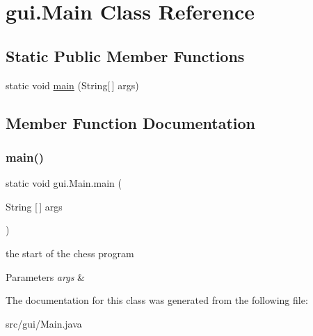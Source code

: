 \hypertarget{classgui_1_1_main}{}\section{gui.\+Main Class Reference}
\label{classgui_1_1_main}
\subsection*{Static Public Member Functions}
\begin{DoxyCompactItemize}
\item 
static void \mbox{\hyperlink{classgui_1_1_main_a041646fffc0529a864bae17dd55c8514}{main}} (String\mbox{[}$\,$\mbox{]} args)
\end{DoxyCompactItemize}


\subsection{Member Function Documentation}
\mbox{\label{classgui_1_1_main_a041646fffc0529a864bae17dd55c8514}} 
\subsubsection{\texorpdfstring{main()}{main()}}
{\footnotesize\ttfamily static void gui.\+Main.\+main (\begin{DoxyParamCaption}\item[{String \mbox{[}$\,$\mbox{]}}]{args }\end{DoxyParamCaption})\hspace{0.3cm}{\ttfamily [static]}}

the start of the chess program 
\begin{DoxyParams}{Parameters}
{\em args} & \\
\hline
\end{DoxyParams}


The documentation for this class was generated from the following file\+:\begin{DoxyCompactItemize}
\item 
src/gui/Main.\+java\end{DoxyCompactItemize}
